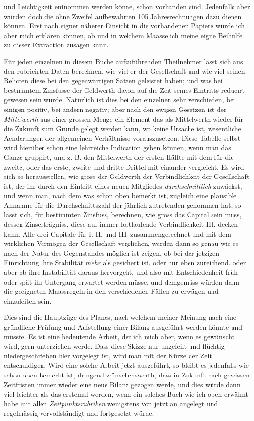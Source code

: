 und Leichtigkeit entnommen werden könne, schon vorhanden sind. Jedenfalls aber würden doch die ohne Zweifel aufbewahrten 105 Jahresrechnungen dazu dienen können. Erst nach eigner näherer Einsicht in die vorhandenen Papiere würde ich aber mich erklären können, ob und in welchem Maasse ich meine eigne Beihülfe zu dieser Extraction zusagen kann.

Für jeden einzelnen in diesem Buche aufzuführenden Theilnehmer lässt sich aus den rubricirten Daten berechnen, wie viel er der Gesellschaft und wie viel seinen Relicten diese bei den gegenwärtigen Sätzen geleistet haben; und was bei bestimmtem Zinsfusse der Geldwerth davon auf die Zeit seines Eintritts reducirt gewesen sein würde. Natürlich ist dies bei den einzelnen sehr verschieden, bei einigen positiv, bei andern negativ; aber nach den ewigen Gesetzen ist der \textit{Mittelwerth} aus einer grossen Menge ein Element das als Mittelwerth wieder für die Zukunft zum Grunde gelegt werden kann, wo keine Ursache ist, wesentliche Aenderungen der allgemeinen Verhältnisse vorauszusetzen. Diese Tabelle selbst wird hierüber schon eine lehrreiche Indication geben können, wenn man das Ganze gruppirt, und z. B. den Mittelwerth der ersten Hälfte mit dem für die zweite, oder das erste, zweite und dritte Drittel mit einander vergleicht. Es wird sich so herausstellen, wie gross der Geldwerth der Verbindlichkeit der Gesellschaft ist, der ihr durch den Eintritt eines neuen Mitgliedes \textit{durchschnittlich} zuwächst, und wenn man, nach dem was schon oben bemerkt ist, zugleich eine plausible Annahme für die Durchschnittszahl der jährlich zutretenden genommen hat, so lässt sich, für bestimmten Zinsfuss, berechnen, wie gross das Capital sein muss, dessen Zinserträgniss, diese auf immer fortlaufende Verbindlichkeit III. decken kann. Alle drei Capitale für I. II. und III. zusammengerechnet und mit dem wirklichen Vermögen der Gesellschaft verglichen, werden dann so genau wie es nach der Natur des Gegenstandes möglich ist zeigen, ob bei der jetzigen Einrichtung ihre Stabilität \textit{mehr} als gesichert ist, oder nur eben zureichend, oder aber ob ihre Instabilität daraus hervorgeht, und also mit Entschiedenheit früh oder spät ihr Untergang erwartet werden müsse, und demgemäss würden dann die geeigneten Maassregeln in den verschiedenen Fällen zu erwägen und einzuleiten sein.

Dies sind die Hauptzüge des Planes, nach welchem meiner Meinung nach eine gründliche Prüfung und Aufstellung einer Bilanz ausgeführt werden könnte und müsste. Es ist eine bedeutende Arbeit, der ich mich aber, wenn es gewünscht wird, gern unterziehen werde. Dass diese Skizze nur ungefeilt und flüchtig niedergeschrieben hier vorgelegt ist, wird man mit der Kürze der Zeit entschuldigen. Wird eine solche Arbeit jetzt ausgeführt, so bleibt es jedenfalls wie schon oben bemerkt ist, dringend wünschenswerth, dass in Zukunft nach gewissen Zeitfristen immer wieder eine neue Bilanz gezogen werde, und dies würde dann viel leichter als das erstemal werden, wenn ein solches Buch wie ich oben erwähnt habe mit allen \textit{Zeitpunktsrubriken} wenigstens von jetzt an angelegt und regelmässig vervollständigt und fortgesetzt würde.

